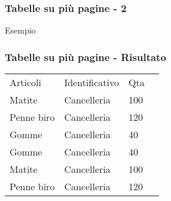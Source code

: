 \begin{frame}[fragile]
 
 \frametitle{Tabelle su più pagine - 2}
 
 \begin{exampleblock}{Esempio}
    
 \end{exampleblock}
\end{frame}
 
\begin{frame}
 
 \frametitle{Tabelle su più pagine - Risultato}
\begin{center}
\begin{longtable}{llll} %
Articoli      & Identificativo & Qta \\
Matite        & Cancelleria    & 100      \\
Penne biro    & Cancelleria    & 120      \\
Gomme         & Cancelleria    & 40       \\
Gomme         & Cancelleria    & 40       \\
Matite        & Cancelleria    & 100      \\
Penne biro    & Cancelleria    & 120      \\
\end{longtable}
\end{center}


\end{frame}
